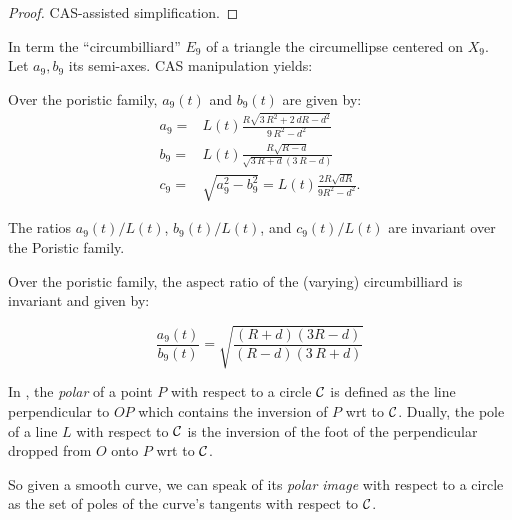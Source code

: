 \begin{proof} 
CAS-assisted simplification.
\end{proof}

In \cite{reznik2021-circum} term the ``circumbilliard'' $E_9$ of a triangle the circumellipse centered on $X_9$. Let $a_9,b_9$ its semi-axes. CAS manipulation yields:

\begin{corollary}
Over the poristic family, $a_9(t)$ and $b_9(t)$ are given by:
\begin{align*}
a_9=&L(t)\frac{R\sqrt {3\,{R}^{2}+2\,dR-{d}^{2}} }{9\,{R}^{2}-{d}^{2}}\\
b_9=&  L(t)\frac{R\sqrt {R-d}}{\sqrt {3\,R+d} (3\,R-d)}\\
  c_9=&\sqrt{a_9^2-b_9^2}=L(t)\frac{2R\sqrt{dR}}{9R^2-d^2}.
\end{align*}
\end{corollary}

\begin{corollary}
The ratios $a_9(t)/L(t)$, $b_9(t)/L(t)$, and $c_9(t)/L(t)$ are invariant over the Poristic family.
\end{corollary}

\begin{corollary}
Over the poristic family, the aspect ratio of the (varying) circumbilliard is invariant and given by:

\begin{equation*}
\frac{a_9(t)}{b_9(t)}=\sqrt{\frac { \left(  R+d \right)  \left( 3R-d \right) }{ \left( R-d
 \right)  \left( 3\,R+d \right) }}
\end{equation*}
\end{corollary}

In \cite[Polar]{mw}, the {\em polar} of a point $P$ with respect to a circle $\mathcal{C}$ is defined as the line perpendicular to $O P$ which contains the inversion of $P$ wrt to $\mathcal{C}$. Dually, the pole of a line $L$ with respect to $\mathcal{C}$ is the inversion of the foot of the perpendicular dropped from $O$ onto $P$ wrt to $\mathcal{C}$.

So given a smooth curve, we can speak of its {\em polar image} with respect to a circle as the set of poles of the curve's tangents with respect to $\mathcal{C}$. 

